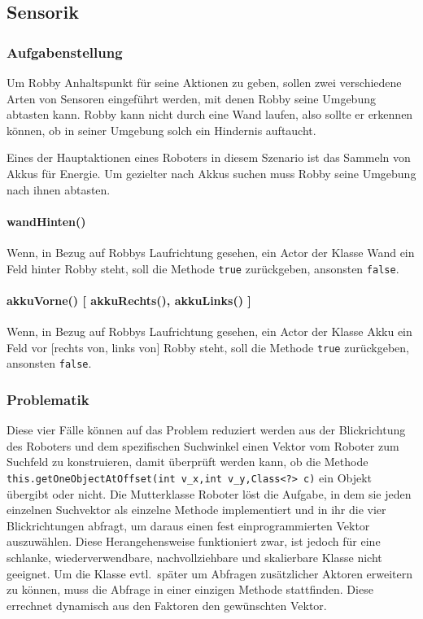 \subsection{Sensorik}

\subsubsection*{Aufgabenstellung}
\label{snsk:aufgabe}
Um Robby Anhaltspunkt für seine Aktionen zu geben, sollen zwei verschiedene Arten von Sensoren eingeführt werden, mit denen Robby seine Umgebung abtasten kann. Robby kann nicht durch eine Wand laufen, also sollte er erkennen können, ob in seiner Umgebung solch ein Hindernis auftaucht.

Eines der Hauptaktionen eines Roboters in diesem Szenario ist das Sammeln von Akkus für Energie. Um gezielter nach Akkus suchen muss Robby seine Umgebung nach ihnen abtasten.

\paragraph{wandHinten()}
Wenn, in Bezug auf Robbys Laufrichtung gesehen, ein Actor der Klasse Wand ein Feld hinter Robby steht, soll die Methode \texttt{true} zurückgeben, ansonsten \texttt{false}.

\paragraph{akkuVorne() [ akkuRechts(), akkuLinks() ]}
Wenn, in Bezug auf Robbys Laufrichtung gesehen, ein Actor der Klasse Akku ein Feld vor [rechts von, links von] Robby steht, soll die Methode \texttt{true} zurückgeben, ansonsten \texttt{false}.

\subsubsection*{Problematik}
\label{snsk:problem}
Diese vier Fälle können auf das Problem reduziert werden aus der Blickrichtung des Roboters und dem spezifischen Suchwinkel einen Vektor vom Roboter zum Suchfeld zu konstruieren, damit überprüft werden kann, ob die Methode \texttt{this.getOneObjectAtOffset(int v_x,int v_y,Class<?> c)} ein Objekt übergibt oder nicht.
Die Mutterklasse Roboter löst die Aufgabe, in dem sie jeden einzelnen Suchvektor als einzelne Methode implementiert und in ihr die vier Blickrichtungen abfragt, um daraus einen fest einprogrammierten Vektor auszuwählen.
Diese Herangehensweise funktioniert zwar, ist jedoch für eine schlanke, wiederverwendbare, nachvollziehbare und skalierbare Klasse nicht geeignet.
Um die Klasse evtl.\ später um Abfragen zusätzlicher Aktoren erweitern zu können, muss die Abfrage in einer einzigen Methode stattfinden. Diese errechnet dynamisch aus den Faktoren den gewünschten Vektor.

